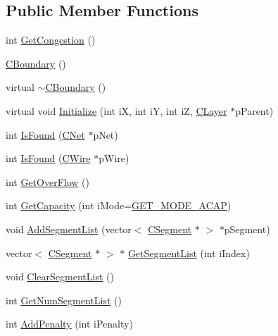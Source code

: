 \subsection*{Public Member Functions}
\begin{DoxyCompactItemize}
\item 
int \mbox{\hyperlink{classCBoundary_a237e626a2043a75be94468425d71d217}{Get\+Congestion}} ()
\item 
\mbox{\hyperlink{classCBoundary_a135f0608ca8f6844a4fbcdf3865ada19}{C\+Boundary}} ()
\item 
virtual \mbox{\hyperlink{classCBoundary_a6a01f673f30be7b33de734dc36df7797}{$\sim$\+C\+Boundary}} ()
\item 
virtual void \mbox{\hyperlink{classCBoundary_a17bf8019eff54892a398e4b13c3ff264}{Initialize}} (int iX, int iY, int iZ, \mbox{\hyperlink{classCLayer}{C\+Layer}} $\ast$p\+Parent)
\item 
int \mbox{\hyperlink{classCBoundary_ab3b3ba7d56c3881511ea7fc38461514e}{Is\+Found}} (\mbox{\hyperlink{classCNet}{C\+Net}} $\ast$p\+Net)
\item 
int \mbox{\hyperlink{classCBoundary_a01471d1353c553f1c36d57e41b31fddd}{Is\+Found}} (\mbox{\hyperlink{classCWire}{C\+Wire}} $\ast$p\+Wire)
\item 
int \mbox{\hyperlink{classCBoundary_a1b1c06eca11d35d0b6f3b1cc9cd8d299}{Get\+Over\+Flow}} ()
\item 
int \mbox{\hyperlink{classCBoundary_ac7a866fd62953129c6940d85d1c57056}{Get\+Capacity}} (int i\+Mode=\mbox{\hyperlink{BoxRouter_8h_aef3dafda6f81349a21e2d550f8e21cd5}{G\+E\+T\+\_\+\+M\+O\+D\+E\+\_\+\+A\+C\+AP}})
\item 
void \mbox{\hyperlink{classCBoundary_a180a2319791010fa59e9a09ffdd2accc}{Add\+Segment\+List}} (vector$<$ \mbox{\hyperlink{classCSegment}{C\+Segment}} $\ast$ $>$ $\ast$p\+Segment)
\item 
vector$<$ \mbox{\hyperlink{classCSegment}{C\+Segment}} $\ast$ $>$ $\ast$ \mbox{\hyperlink{classCBoundary_a3d96c4869c86bae2cd7bb88df47be984}{Get\+Segment\+List}} (int i\+Index)
\item 
void \mbox{\hyperlink{classCBoundary_a3ecfdd0a85d3ca7b3b03e4319bd6b2d1}{Clear\+Segment\+List}} ()
\item 
int \mbox{\hyperlink{classCBoundary_ac1b6d9afabe595f1ae4123d4ffd27813}{Get\+Num\+Segment\+List}} ()
\item 
int \mbox{\hyperlink{classCBoundary_afbfef3747d340a2a8561c24a9830935a}{Add\+Penalty}} (int i\+Penalty)
\item 

\end{DoxyCompactItemize}
